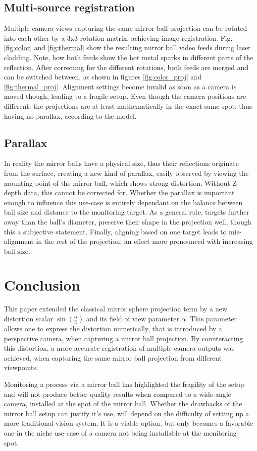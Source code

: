 \documentclass[10pt]{article}
\begin{document}
\begin{multicols}{2}
	\subsection{Multi-source registration}
	Multiple camera views capturing the same mirror ball projection can be rotated into each other by a 3x3 rotation matrix, achieving image registration. Fig. \ref{fig:color} and \ref{fig:thermal} show the resulting mirror ball video feeds during laser cladding. Note, how both feeds show the hot metal sparks in different parts of the reflection. After correcting for the different rotations, both feeds are merged and can be switched between, as shown in figures \ref{fig:color_proj} and \ref{fig:thermal_proj}. Alignment settings become invalid as soon as a camera is moved though, leading to a fragile setup. Even though the camera positions are different, the projections are at least mathematically in the exact same spot, thus having no parallax, according to the model.
	
	\subsection{Parallax}\label{parallax}
	In reality the mirror balls have a physical size, thus their reflections originate from the surface, creating a new kind of parallax, easily observed by viewing the mounting point of the mirror ball, which shows strong distortion. Without Z-depth data, this cannot be corrected for. Whether the parallax is important enough to influence this use-case is entirely dependant on the balance between ball size and distance to the monitoring target. As a general rule, targets further away than the ball's diameter, preserve their shape in the projection well, though this a subjective statement. Finally, aligning based on one target leads to mis-alignment in the rest of the projection, an effect more pronounced with increasing ball size.

	\section{Conclusion}
	This paper extended the classical mirror sphere projection term by a new distortion scalar $\sin{\left(\frac{\alpha}{4}\right)}$ and its field of view parameter $\alpha$. This parameter allows one to express the distortion numerically, that is introduced by a perspective camera, when capturing a mirror ball projection. By counteracting this distortion, a more accurate registration of multiple camera outputs was achieved, when capturing the same mirror ball projection from different viewpoints.

	Monitoring a process via a mirror ball has highlighted the fragility of the setup and will not produce better quality results when compared to a wide-angle camera, installed at the spot of the mirror ball. Whether the drawbacks of the mirror ball setup can justify it's use, will depend on the difficulty of setting up a more traditional vision system. It is a viable option, but only becomes a favorable one in the niche use-case of a camera not being installable at the monitoring spot.

	
\end{multicols}
\end{document}

